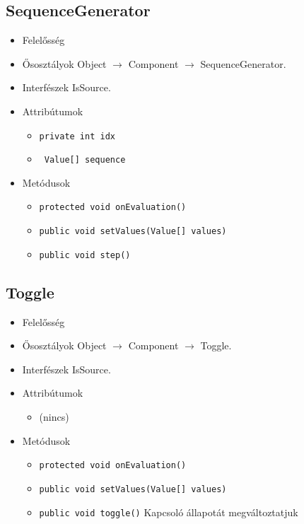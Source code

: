 \subsection{SequenceGenerator}
\begin{itemize}
\item Felelősség

\item Ősosztályok Object $\rightarrow{}$ Component $\rightarrow{}$ SequenceGenerator.
\item Interfészek IsSource.
\item Attribútumok $\ $
\begin{itemize}
	\item \texttt{private int idx} 
	\item \texttt{ Value[] sequence} 
\end{itemize}
\item Metódusok$\ $
\begin{itemize}
	\item \texttt{protected void onEvaluation()} 
	\item \texttt{public void setValues(Value[] values)} 
	\item \texttt{public void step()} 
\end{itemize}
\end{itemize}

\subsection{Toggle}
\begin{itemize}
\item Felelősség

\item Ősosztályok Object $\rightarrow{}$ Component $\rightarrow{}$ Toggle.
\item Interfészek IsSource.
\item Attribútumok $\ $
\begin{itemize}
\item (nincs)
\end{itemize}
\item Metódusok$\ $
\begin{itemize}
	\item \texttt{protected void onEvaluation()} 
	\item \texttt{public void setValues(Value[] values)} 
	\item \texttt{public void toggle()} Kapcsoló állapotát megváltoztatjuk
\end{itemize}
\end{itemize}

